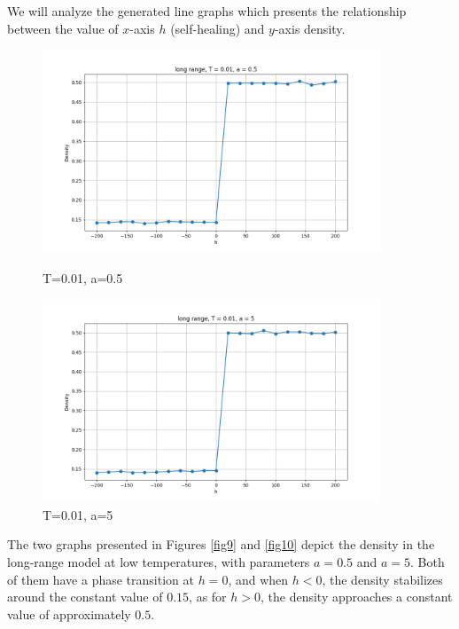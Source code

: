 \documentclass[11pt]{book}
\begin{document}
We will analyze the generated line graphs which presents the relationship between the value of $x$-axis $h$ (self-healing) and $y$-axis density. 
\begin{figure}
    \centering
    \begin{minipage}{0.45\textwidth}
        \centering
        \includegraphics[width=0.9\textwidth]{long range,T=0.01,a=0.5.jpg} %
        \caption{T=0.01, a=0.5}
        \label{fig9}
    \end{minipage}\hfill
    \begin{minipage}{0.45\textwidth}
        \centering
        \includegraphics[width=0.9\textwidth]{long range,T=0.01,a=5.jpg} %
        \caption{T=0.01, a=5}
        \label{fig10}
    \end{minipage}
\end{figure}

The two graphs presented in Figures \eqref{fig9} and \eqref{fig10} depict the density in the long-range model at low temperatures, with parameters $a = 0.5$ and $a = 5$. Both of them have a phase transition at $h=0$, and when $h<0$, the density stabilizes around the constant value of $0.15$, as for $h>0$, the density approaches a constant value of approximately $0.5$.
\end{document}
